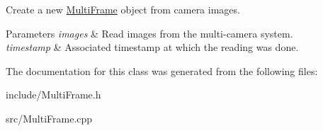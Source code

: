 Create a new \hyperlink{classMultiFrame}{Multi\+Frame} object from camera images. 
\begin{DoxyParams}{Parameters}
{\em images} & Read images from the multi-\/camera system. \\
\hline
{\em timestamp} & Associated timestamp at which the reading was done. \\
\hline
\end{DoxyParams}


The documentation for this class was generated from the following files\+:\begin{DoxyCompactItemize}
\item 
include/Multi\+Frame.\+h\item 
src/Multi\+Frame.\+cpp\end{DoxyCompactItemize}
